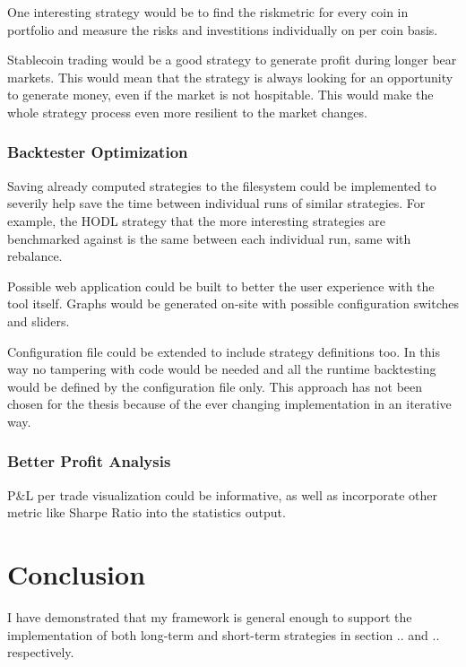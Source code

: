 One interesting strategy would be to find the riskmetric for every coin in portfolio and measure the risks and investitions individually on per coin basis.

Stablecoin trading would be a good strategy to generate profit during longer bear markets. This would mean that the strategy is always looking for an opportunity to generate money, even if the market is not hospitable. This would make the whole strategy process even more resilient to the market changes.

\subsection*{Backtester Optimization}
Saving already computed strategies to the filesystem could be implemented to severily help save the time between individual runs of similar strategies. For example, the HODL strategy that the more interesting strategies are benchmarked against is the same between each individual run, same with rebalance.

Possible web application could be built to better the user experience with the tool itself. Graphs would be generated on-site with possible configuration switches and sliders.

Configuration file could be extended to include strategy definitions too. In this way no tampering with code would be needed and all the runtime backtesting would be defined by the configuration file only. This approach has not been chosen for the thesis because of the ever changing implementation in an iterative way.

\subsection*{Better Profit Analysis}
P\&L per trade visualization could be informative, as well as incorporate other metric like Sharpe Ratio into the statistics output.

\chapter{Conclusion}
I have demonstrated that my framework is general enough to support the implementation of both long-term and short-term strategies in section .. and .. respectively.

\label{conclusion}
